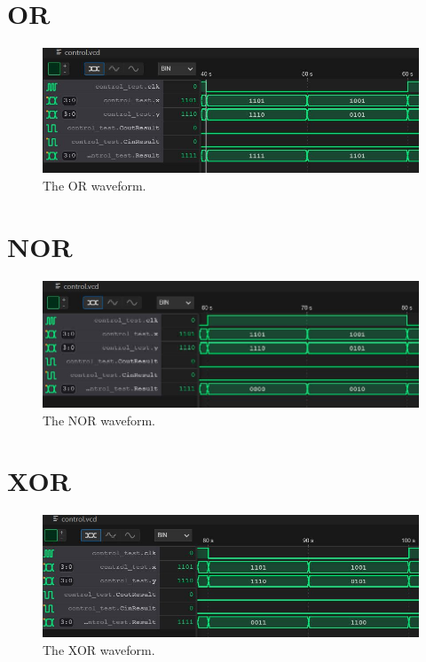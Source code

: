 \documentclass[
	letterpaper, %
	10pt, %
]{CSUniSchoolLabReport}
\begin{document}
\section{OR}
\begin{figure}[H] %
    \includegraphics[width=\textwidth]{figures/or.JPG} %
    \caption{The OR waveform.}
\end{figure}
\section{NOR}
\begin{figure}[H] %
    \includegraphics[width=\textwidth]{figures/nor.JPG} %
    \caption{The NOR waveform.}
\end{figure}
\section{XOR}
\begin{figure}[H] %
    \includegraphics[width=\textwidth]{figures/xor.JPG} %
    \caption{The XOR waveform.}
\end{figure}
\end{document}
